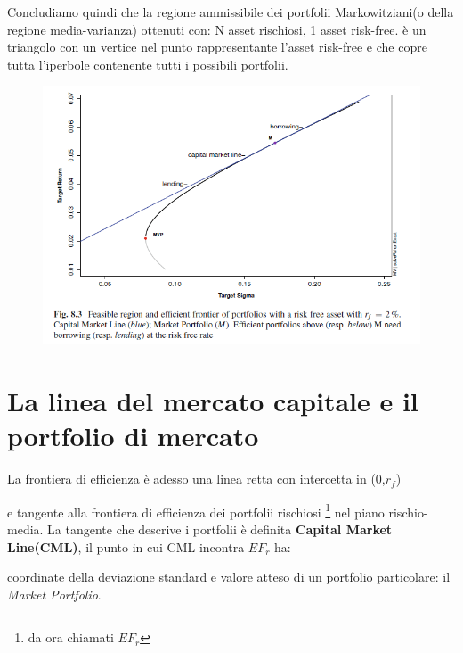 \documentclass[a4paper,11pt]{report}
\begin{document}
{	Concludiamo quindi che la regione ammissibile dei portfolii Markowitziani(o della regione media-varianza) ottenuti con:
	N asset rischiosi,
	1 asset risk-free.
	è un triangolo con un vertice nel punto rappresentante l'asset risk-free e che copre tutta l'iperbole contenente tutti i possibili 		portfolii. 
\begin{figure}[h]
  	\includegraphics[width=\linewidth]{EfficientFrontier_Triangle.png}
	  \label{fig:EfficientTriangle}
\end{figure}
	\newpage

\section{La linea del mercato capitale e il portfolio di mercato}
	La frontiera di efficienza è adesso una linea retta con intercetta in (0,$r_f$) 

	e tangente alla frontiera di efficienza dei portfolii rischiosi \footnote{ da ora chiamati $EF_r$} nel piano rischio-media. \newline
	La tangente che descrive i portfolii è definita \textbf{Capital Market Line(CML)}, il punto in cui CML  incontra $EF_r$ ha:

	coordinate della deviazione standard e valore atteso di un portfolio particolare: il \emph{Market Portfolio}.
}
\end{document}
